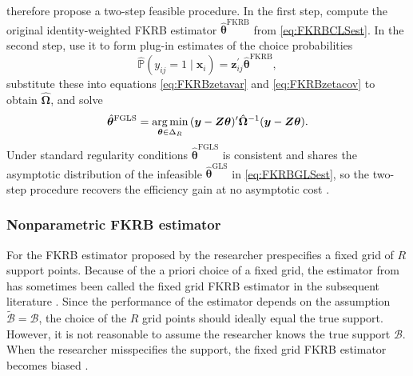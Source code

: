 \citet{FoxKimRyanBajari2011} therefore propose a two-step feasible procedure.
In the first step, compute the original identity-weighted FKRB estimator $\hat{\bm{\theta}}^{\mathrm{FKRB}}$ from \cref{eq:FKRBCLSest}.
In the second step, use it to form plug-in estimates of the choice probabilities
\begin{equation}
\label{eq:FKRBPhat}
    \hat{\mathbb{P}}(y_{ij} = 1 \mid \bm{x}_i) = \bm{z}_{ij}^\prime \hat{\bm{\theta}}^{\mathrm{FKRB}},
\end{equation}
substitute these into equations \eqref{eq:FKRBzetavar} and \eqref{eq:FKRBzetacov} to obtain $\hat{\bm{\Omega}}$, and solve
\begin{equation}
\label{eq:FKRBFGLSest}
    \hat{\bm{\theta}}^{\mathrm{FGLS}} = \operatorname*{arg\,min}_{\bm{\theta} \in \Delta_R}\,(\bm{y} - \bm{Z}\bm{\theta})^\prime \hat{\bm{\Omega}}^{-1}(\bm{y} - \bm{Z}\bm{\theta}).
\end{equation}
Under standard regularity conditions $\hat{\bm{\theta}}^{\mathrm{FGLS}}$ is consistent and shares the asymptotic distribution of the infeasible $\hat{\bm{\theta}}^{\mathrm{GLS}}$ in \cref{eq:FKRBGLSest}, so the two-step procedure recovers the efficiency gain at no asymptotic cost \citep{Greene2019}.
\subsubsection{Nonparametric FKRB estimator}
\label{sec:nonparametricFKRB}
For the FKRB estimator proposed by \citet{FoxKimRyanBajari2011} the researcher prespecifies a fixed grid of $R$ support points.
Because of the a priori choice of a fixed grid, the estimator from \citet{FoxKimRyanBajari2011} has sometimes been called the fixed grid FKRB estimator in the subsequent literature \citep[see][]{FoxKimYang2016,HeissHetzeneckerOsterhaus2022}.
Since the performance of the estimator depends on the assumption $\tilde{\mathcal{B}} = \mathcal{B}$, the choice of the $R$ grid points should ideally equal the true support.
However, it is not reasonable to assume the researcher knows the true support $\mathcal{B}$.
When the researcher misspecifies the support, the fixed grid FKRB estimator becomes biased \citep{FoxKimYang2016}.

